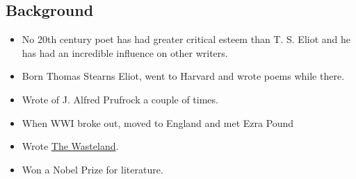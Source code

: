 \documentclass[11pt]{article}
\begin{document}
\subsection{Background}
\begin{itemize}
	\item No 20th century poet has had greater critical esteem than T. S. Eliot
		and he has had an incredible influence on other writers.
	\item Born Thomas Stearns Eliot, went to Harvard and wrote poems while there.
	\item Wrote of J. Alfred Prufrock a couple of times.
	\item When WWI broke out, moved to England and met Ezra Pound
	\item Wrote \underline{The Wasteland}.
	\item Won a Nobel Prize for literature.
\end{itemize}
\end{document}
